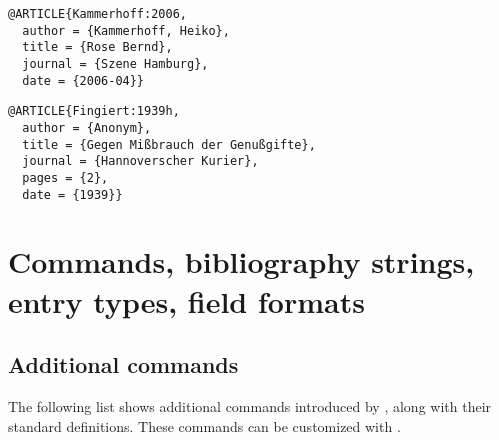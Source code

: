 \documentclass[english]{scrartcl}
\begin{document}
\begin{lstlisting}
@ARTICLE{Kammerhoff:2006,
  author = {Kammerhoff, Heiko},
  title = {Rose Bernd},
  journal = {Szene Hamburg},
  date = {2006-04}}
\end{lstlisting}

\begin{lstlisting}
@ARTICLE{Fingiert:1939h,
  author = {Anonym},
  title = {Gegen Mißbrauch der Genußgifte},
  journal = {Hannoverscher Kurier},
  pages = {2},
  date = {1939}}
\end{lstlisting}

\section{Commands, bibliography strings, entry types, field formats}
\subsection{Additional commands}
The following list shows additional commands introduced by \bldw{}, along with their standard definitions. These commands can be customized with .
\end{document}
